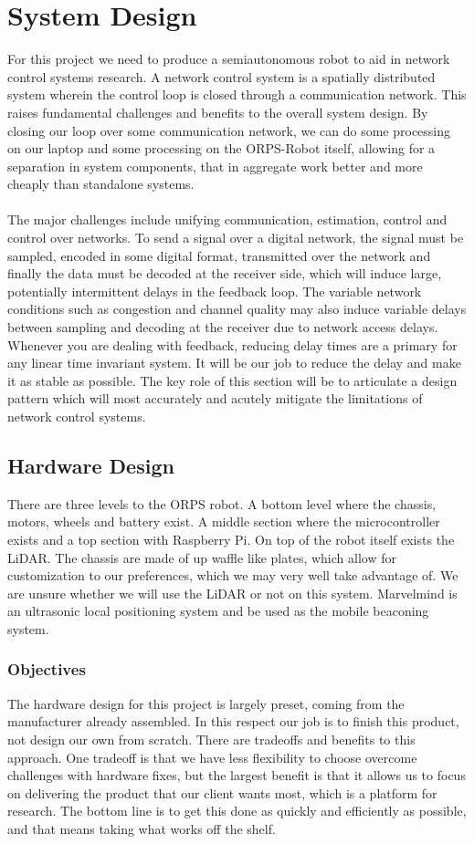 \documentclass[english,12pt]{article}
\begin{document}
\section{System Design}
For this project we need to produce a semiautonomous robot to aid in network control systems
research. A network control system is a spatially distributed system wherein the control loop is closed
through a communication network. This raises fundamental challenges and benefits to the overall 
system design. By closing our loop over some communication network, we can do some processing on
our laptop and some processing on the ORPS-Robot itself, allowing for a separation in system
components, that in aggregate work better and more cheaply than standalone systems.\\\\ 
The major challenges include unifying communication, estimation, control and control over networks. To send a
signal over a digital network, the signal must be sampled, encoded in some digital format, transmitted
over the network and finally the data must be decoded at the receiver side, which will induce large,
potentially intermittent delays in the feedback loop. The variable network conditions such as congestion
and channel quality may also induce variable delays between sampling and decoding at the receiver due
to network access delays. Whenever you are dealing with feedback, reducing delay times are a primary
for any linear time invariant system. It will be our job to reduce the delay and make it as stable as
possible. The key role of this section will be to articulate a design pattern which will most accurately and
acutely mitigate the limitations of network control systems.
\subsection{Hardware Design}
There are three levels to the ORPS robot. A bottom level where the chassis, motors, wheels and battery
exist. A middle section where the microcontroller exists and a top section with Raspberry Pi. On top of the robot
itself exists the LiDAR. The chassis are made of up waffle like plates, which allow for customization to
our preferences, which we may very well take advantage of. We are unsure whether we will use the
LiDAR or not on this system. Marvelmind is an ultrasonic local positioning system and be used as 
the mobile beaconing system.
\subsubsection{Objectives}
The hardware design for this project is largely preset, coming from the manufacturer already assembled.
In this respect our job is to finish this product, not design our own from scratch. There are tradeoffs and
benefits to this approach. One tradeoff is that we have less flexibility to choose overcome challenges
with hardware fixes, but the largest benefit is that it allows us to focus on delivering the product that
our client wants most, which is a platform for research. The bottom line is to get this done as quickly and
efficiently as possible, and that means taking what works off the shelf.
\end{document}

